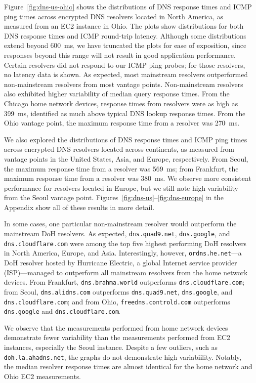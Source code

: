 Figure~\ref{fig:dns-us-ohio} shows the distributions of DNS response times and
ICMP ping times across encrypted DNS resolvers located in North America, as
measured from an EC2 instance in Ohio.  The plots show distributions for both
DNS response times and ICMP round-trip latency.  Although some distributions
extend beyond 600~ms, we have truncated the plots for ease of exposition,
since responses beyond this range will not result in good application
performance.  Certain resolvers did not respond to our ICMP ping probes; for
those resolvers, no latency data is shown.
As expected, most mainstream resolvers outperformed non-mainstream resolvers
from most vantage points.  Non-mainstream resolvers also exhibited higher
variability of median query response times.  
From the Chicago home network devices, response times from resolvers were as
high as 399~ms, identified as much above typical DNS lookup response times.
From the Ohio vantage point, the maximum response time from a resolver was 270~ms. 

We also explored the distributions of DNS response times and ICMP ping times
across encrypted DNS resolvers located across continents, as measured from
vantage points in the United States, Asia, and Europe, respectively.  From
Seoul, the maximum response time from a resolver was 569~ms; from Frankfurt,
the maximum response time from a resolver was 380~ms.  We observe more
consistent performance for resolvers located in Europe, but we still note high
variability from the Seoul vantage point.
Figures~\ref{fig:dns-us}--\ref{fig:dns-europe} in the Appendix show all of
these results in more detail.

In some cases, one particular non-mainstream resolver would outperform
the mainstream DoH resolvers.  As expected, \texttt{dns.quad9.net},
\texttt{dns.google}, and \texttt{dns.cloudflare.com} were among the top five
highest performing DoH resolvers in North America, Europe, and Asia.
Interestingly, however, \texttt{ordns.he.net}---a DoH resolver hosted by
Hurricane Electric, a global Internet service provider (ISP)---managed to
outperform all mainstream resolvers from the home network devices. From Frankfurt, \texttt{dns.brahma.world}
outperforms \texttt{dns.cloudflare.com}; from Seoul, \texttt{dns.alidns.com} outperforms \texttt{dns.quad9.net},
\texttt{dns.google}, and \texttt{dns.cloudflare.com}; and from Ohio, \texttt{freedns.controld.com} outperforms \texttt{dns.google}
and \texttt{dns.cloudflare.com}.

We observe that the measurements performed from home network devices 
demonstrate fewer variability than the measurements performed from EC2 instances, 
especially the Seoul instance. Despite a few outliers, such as \texttt{doh.la.ahadns.net}, 
the graphs do not demonstrate high variabiility. Notably, the median resolver response 
times are almost identical for the home network and Ohio EC2 measurements. 

